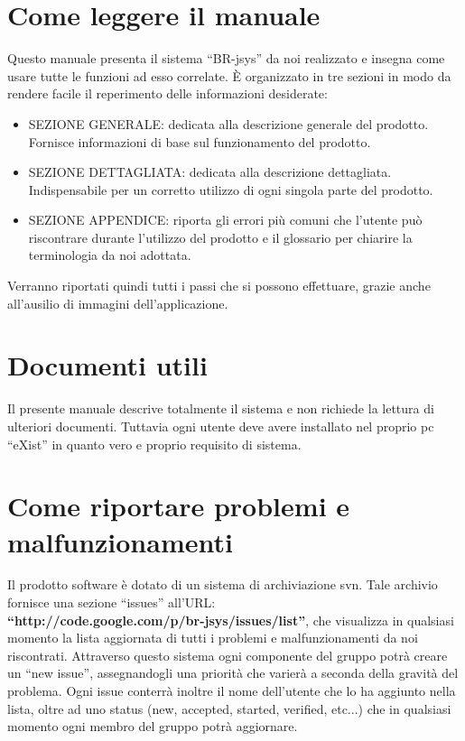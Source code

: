 \section{Come leggere il manuale}
Questo manuale presenta il sistema ``BR-jsys'' da noi realizzato e insegna come usare tutte le funzioni ad esso correlate. \`E organizzato in tre sezioni in modo da rendere facile il reperimento delle informazioni desiderate:
\begin{itemize}
\item SEZIONE GENERALE: dedicata alla descrizione generale del prodotto. Fornisce informazioni di base sul funzionamento del prodotto.
\item SEZIONE DETTAGLIATA: dedicata alla descrizione dettagliata. Indispensabile per un corretto utilizzo di ogni singola parte del prodotto.
\item SEZIONE APPENDICE: riporta gli errori pi\`u comuni che l'utente pu\`o riscontrare durante l'utilizzo del prodotto e il glossario per chiarire la terminologia da noi adottata.
\end{itemize}
Verranno riportati quindi tutti i passi che si possono effettuare, grazie anche all'ausilio di immagini dell'applicazione.
\section{Documenti utili}
Il presente manuale descrive totalmente il sistema e non richiede la lettura di ulteriori documenti. Tuttavia ogni utente deve avere installato nel proprio pc ``eXist'' in quanto vero e proprio requisito di sistema. 
\section{Come riportare problemi e malfunzionamenti}
Il prodotto software \`e dotato di un sistema di archiviazione svn. Tale archivio fornisce una sezione ``issues'' all'URL: \\ 
\textbf{``http://code.google.com/p/br-jsys/issues/list''}, che visualizza in qualsiasi momento la lista aggiornata di tutti i problemi e malfunzionamenti da noi riscontrati. Attraverso questo sistema ogni componente del gruppo potr\`a creare un ``new issue'', assegnandogli una priorit\`a che varier\`a a seconda della gravit\`a del problema. Ogni issue conterr\`a inoltre il nome dell'utente che lo ha aggiunto nella lista, oltre ad uno status (new, accepted, started, verified, etc...) che in qualsiasi momento ogni membro del gruppo potr\`a aggiornare. 


